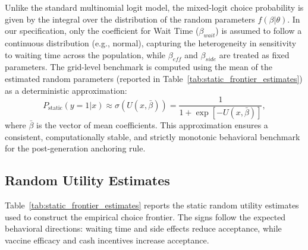 \documentclass[11pt]{article}
\begin{document}
Unlike the standard multinomial logit model, the mixed-logit choice probability is given by the integral over the distribution of the random parameters $f(\beta|\theta)$. In our specification, only the coefficient for Wait Time ($\beta_{wait}$) is assumed to follow a continuous distribution (e.g., normal), capturing the heterogeneity in sensitivity to waiting time across the population, while $\beta_{eff}$ and $\beta_{side}$ are treated as fixed parameters. The grid-level benchmark is computed using the mean of the estimated random parameters (reported in Table~\ref{tab:static_frontier_estimates}) as a deterministic approximation:
\[
P_{\mathrm{static}}(y=1|x) \approx \sigma(U(x, \bar{\beta})) = \frac{1}{1 + \exp[-U(x, \bar{\beta})]},
\]
where $\bar{\beta}$ is the vector of mean coefficients. This approximation ensures a consistent, computationally stable, and strictly monotonic behavioral benchmark for the post-generation anchoring rule.

\subsection{Random Utility Estimates}

Table~\ref{tab:static_frontier_estimates} reports the static random utility estimates used to construct the empirical choice frontier. The signs follow the expected behavioral directions: waiting time and side effects reduce acceptance, while vaccine efficacy and cash incentives increase acceptance.
\end{document}

